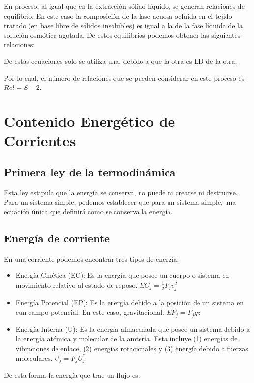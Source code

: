 En proceso, al igual que en la extracción sólido-líquido, se generan relaciones de equilibrio. En este caso la composición de la fase acuosa ocluida en el tejido tratado (en base libre de sólidos insolubles) es igual a la de la fase líquida de la solución osmótica agotada.
De estos equilibrios podemos obtener las siguientes relaciones:


De estas ecuaciones solo se utiliza una, debido a que la otra es LD de la otra.

Por lo cual, el número de relaciones que se pueden considerar en este proceso es $Rel=S-2$.

\clearpage
\section{Contenido Energético de Corrientes}

\subsection{Primera ley de la termodinámica}

Esta ley estipula que la energía se conserva, no puede ni crearse ni destruirse. Para un sistema simple, podemos establecer que para un sistema simple, una ecuación única que definirá como se conserva la energía.

\subsection{Energía de corriente}

En una corriente podemos encontrar tres tipos de energía:
\begin{itemize}
    \item Energía Cinética (EC): Es la energía que posee un cuerpo o sistema en movimiento relativo al estado de reposo. $EC_j=\frac{1}{2}F_jv_j^2$
    \item Energía Potencial (EP): Es la energía debido a la posición de un sistema en cun campo potencial. En este caso, gravitacional. $EP_j=F_jgz$
    \item Energía Interna (U): Es la energía almacenada que posee un sistema debido a la energía atómica y molecular de la amteria. Esta incluye (1) energías de vibraciones de enlace, (2) energías rotacionales y (3) energía debido a fuerzas moleculares. $U_j=F_jU_j^*$
\end{itemize}
De esta forma la energía que trae un flujo es:

